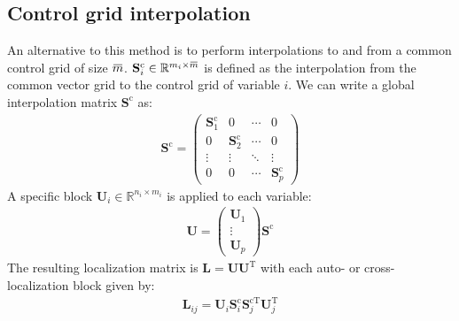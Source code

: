 \documentclass[12pt]{scrartcl}
\newcommand{\overbar}[1]{\mkern 1.5mu\overline{\mkern-1.5mu#1\mkern-1.5mu}\mkern 1.5mu}
\begin{document}
\subsection{Control grid interpolation}
An alternative to this method is to perform interpolations to and from a common control grid of size $\overbar{m}$. $\mathbf{S}^\mathrm{c}_i \in \mathbb{R}^{m_i \times \overbar{m}}$ is defined as the interpolation from the common vector grid to the control grid of variable $i$. We can write a global interpolation matrix $\mathbf{S}^\mathrm{c}$ as:
\begin{align}
\mathbf{S}^\mathrm{c} = \left( \begin{array}{cccc}
\mathbf{S}^\mathrm{c}_1 & 0 & \cdots & 0 \\
0 & \mathbf{S}^\mathrm{c}_2 & \cdots & 0 \\
\vdots & \vdots & \ddots & \vdots \\
0 & 0 & \cdots & \mathbf{S}^\mathrm{c}_p
\end{array} \right)
\end{align}
A specific block $\mathbf{U}_i \in \mathbb{R}^{n_i \times m_i}$ is applied to each variable:
\begin{align}
\mathbf{U} = \left( \begin{array}{c}
\mathbf{U}_1 \\
\vdots \\
\mathbf{U}_p
\end{array} \right) \mathbf{S}^\mathrm{c}
\end{align}
The resulting localization matrix is $\mathbf{L} = \mathbf{U} \mathbf{U}^\mathrm{T}$ with each auto- or cross-localization block given by: 
\begin{align}
\mathbf{L}_{ij} = \mathbf{U}_i \mathbf{S}^\mathrm{c}_i \mathbf{S}_j^{\mathrm{c} \mathrm{T}} \mathbf{U}_j^\mathrm{T}
\end{align}
\end{document}
